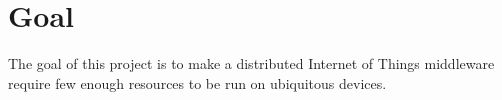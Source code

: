 \section{Goal}
The goal of this project is to make a distributed Internet of Things middleware require few enough resources to be run on ubiquitous devices. 